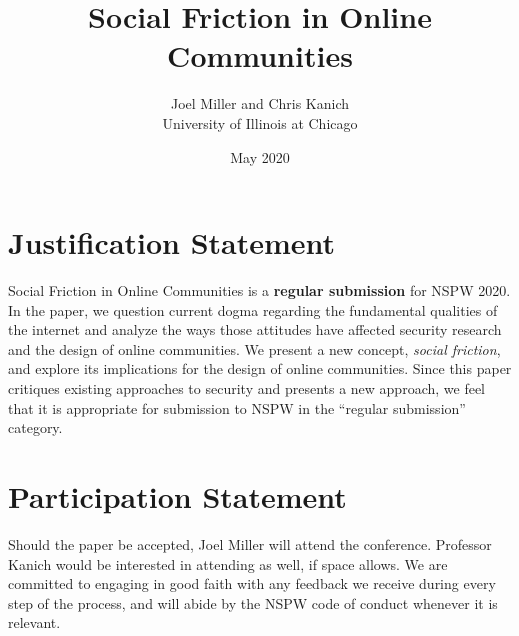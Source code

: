 \documentclass{article}
\title{Social Friction in Online Communities}
\author{Joel Miller and Chris Kanich\\University of Illinois at Chicago}
\date{May 2020}
\begin{document}
\maketitle

\section{Justification Statement}


Social Friction in Online Communities is a \textbf{regular submission} for NSPW 2020. In the paper, we question current dogma regarding the fundamental qualities of the internet and analyze the ways those attitudes have affected security research and the design of online communities. We present a new concept, \textit{social friction}, and explore its implications for the design of online communities. Since this paper critiques existing approaches to security and presents a new approach, we feel that it is  appropriate for submission to NSPW in the ``regular submission'' category.

\section{Participation Statement}

Should the paper be accepted, Joel Miller will attend the conference. Professor Kanich would be interested in attending as well, if space allows. We are committed to engaging in good faith with any feedback we receive during every step of the process, and will abide by the NSPW code of conduct whenever it is relevant.
\end{document}
